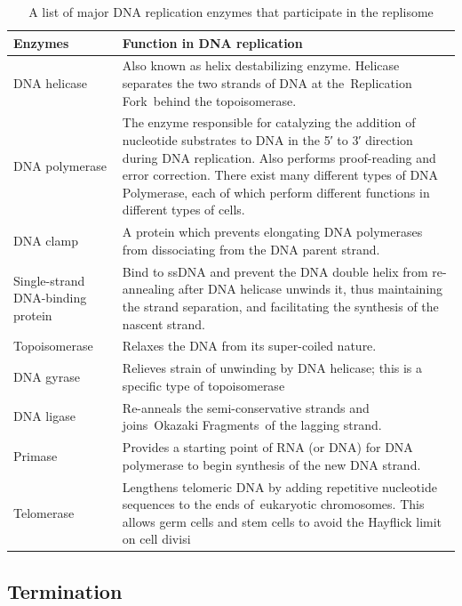 \onecolumn
\begin{table}
\caption{\label{tab:heteroploidy}A list of major DNA replication enzymes that participate in the replisome}
\centering
\begin{tabular}[t]{>{\raggedright\arraybackslash}p{20em}>{\raggedright\arraybackslash}p{45em}}
\toprule
Enzymes & Function in DNA replication\\
\midrule
\rowcolor{gray!6}  DNA helicase & Also known as helix destabilizing enzyme. Helicase separates the two strands of DNA at the Replication Fork behind the topoisomerase.\\
DNA polymerase & The enzyme responsible for catalyzing the addition of nucleotide substrates to DNA in the 5′ to 3′ direction during DNA replication. Also performs proof-reading and error correction. There exist many different types of DNA Polymerase, each of which perform different functions in different types of cells.\\
\rowcolor{gray!6}  DNA clamp & A protein which prevents elongating DNA polymerases from dissociating from the DNA parent strand.\\
Single-strand DNA-binding protein & Bind to ssDNA and prevent the DNA double helix from re-annealing after DNA helicase unwinds it, thus maintaining the strand separation, and facilitating the synthesis of the nascent strand.\\
\rowcolor{gray!6}  Topoisomerase & Relaxes the DNA from its super-coiled nature.\\
\addlinespace
DNA gyrase & Relieves strain of unwinding by DNA helicase; this is a specific type of topoisomerase\\
\rowcolor{gray!6}  DNA ligase & Re-anneals the semi-conservative strands and joins Okazaki Fragments of the lagging strand.\\
Primase & Provides a starting point of RNA (or DNA) for DNA polymerase to begin synthesis of the new DNA strand.\\
\rowcolor{gray!6}  Telomerase & Lengthens telomeric DNA by adding repetitive nucleotide sequences to the ends of eukaryotic chromosomes. This allows germ cells and stem cells to avoid the Hayflick limit on cell divisi\\
\bottomrule
\end{tabular}
\end{table}

\twocolumn

\hypertarget{termination}{%
\subsection{Termination}\label{termination}}

